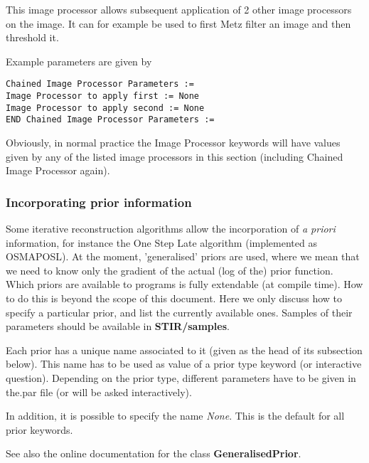 \documentclass{article}
\begin{document}
{ 
}

This image processor allows subsequent application of 2 other 
image processors on the image. It can for example be used to 
first Metz filter an image and then threshold it.

{ 
}

Example parameters are given by

\begin{verbatim}
Chained Image Processor Parameters :=
Image Processor to apply first := None
Image Processor to apply second := None
END Chained Image Processor Parameters :=
\end{verbatim}

Obviously, in normal practice the Image Processor keywords will 
have values given by any of the listed image processors in this 
section (including Chained Image Processor again).



\subsubsection{
Incorporating prior information}
\label{sec:priors}
Some iterative reconstruction algorithms allow the incorporation 
of \textit{a priori} information, for instance the One Step Late algorithm 
(implemented as OSMAPOSL). At the moment, 'generalised' priors 
are used, where we mean that we need to know only the gradient 
of the actual (log of the) prior function.\\
Which priors are available to programs is fully extendable (at 
compile time). How to do this is beyond the scope of this document. 
Here we only discuss how to specify a particular prior, and list 
the currently available ones. Samples of their parameters should 
be available in \textbf{STIR/samples}.



Each prior has a unique name associated to it (given as the head 
of its subsection below). This name has to be used as value of 
a prior type keyword (or interactive question). Depending on 
the prior type, different parameters have to be given in the.par 
file (or will be asked interactively).


In addition, it is possible to specify the name \textit{None}. This 
is the default for all prior keywords.


See also the online documentation for the class \textbf{GeneralisedPrior}.
\end{document}
